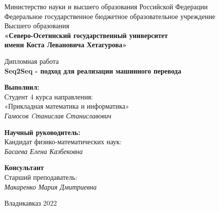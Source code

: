 \setcounter{page}{0}

\begin{center}
	\small{Министерство науки и высшего образования Российской Федерации}\\
	\small{Федеральное государственное бюджетное образовательное учреждение}\\
	\small{Высшего образования}\\
	\small{\textbf{«Северо-Осетинский государственный университет\\
			имени Коста Левановича Хетагурова»}}\\
	
	\hfill \break
	\hfill \break
	\hfill \break
	\hfill \break
	\hfill \break
	\hfill \break
	\hfill \break
	\hfill \break
	\hfill \break
	\hfill \break
	\hfill \break
	\hfill \break
	\hfill \break
	
	\normalsize{Дипломная работа}\\
	\large{\textbf{Seq2Seq - подход для реализации машинного перевода}}\\
	
	\hfill \break
	\hfill \break
	\hfill \break
	\hfill \break
	\hfill \break
	\hfill\break
\end{center}

\begin{flushright}
	\textbf{Выполнил:}\\
	Студент 4 курса направления:\\
	«Прикладная математика и информатика»\\
	\textit{Гамосов Cтанислав Станиславович \underline{\hspace{3cm}}}\\
\end{flushright}

\hfill

\begin{flushright}
	\textbf{Научный руководитель:}\\
	Кандидат физико-математических наук:\\
	\textit{Басаева Елена Казбековна \underline{\hspace{3cm}}}\\
\end{flushright}

\hfill

\begin{flushright}
	\textbf{Консультант}\\
	Старший преподаватель: \\
	\textit{Макаренко Мария Дмитриевна \underline{\hspace{3cm}}}\\
\end{flushright}

\normalsize{ \hspace{28pt}} \hfill \break
\begin{center} Владикавказ 2022 \end{center}
\thispagestyle{empty}
\clearpage